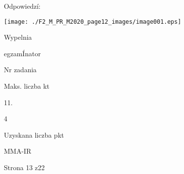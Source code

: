 \documentclass[a4paper,12pt]{article}
\begin{document}
Odpowiedzí:
\begin{center}
\texttt{[image: ./F2\_M\_PR\_M2020\_page12\_images/image001.eps]}
\end{center}
Wypelnia

egzamÍnator

Nr zadania

Maks. liczba kt

11.

4

Uzyskana liczba pkt

MMA-IR

Strona 13 z22
\end{document}
